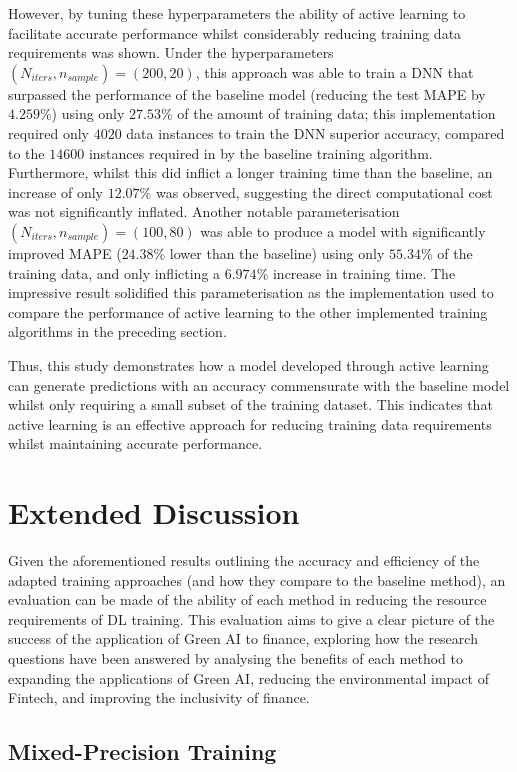 \documentclass[a4paper, 11pt]{report}
\begin{document}
    However, by tuning these hyperparameters the ability of active learning to facilitate accurate performance whilst considerably reducing training data requirements was shown. Under the hyperparameters $(N_{iters}, n_{sample}) = (200, 20)$, this approach was able to train a DNN that surpassed the performance of the baseline model (reducing the test MAPE by $4.259\%$) using only $27.53\%$ of the amount of training data; this implementation required only $4020$ data instances to train the DNN superior accuracy, compared to the $14600$ instances required in by the baseline training algorithm. Furthermore, whilst this did inflict a longer training time than the baseline, an increase of only $12.07\%$ was observed, suggesting the direct computational cost was not significantly inflated. Another notable parameterisation $(N_{iters}, n_{sample}) = (100, 80)$ was able to produce a model with significantly improved MAPE ($24.38\%$ lower than the baseline) using only $55.34\%$ of the training data, and only inflicting a $6.974\%$ increase in training time. The impressive result solidified this parameterisation as the implementation used to compare the performance of active learning to the other implemented training algorithms in the preceding section. 

    Thus, this study demonstrates how a model developed through active learning can generate predictions with an accuracy commensurate with the baseline model whilst only requiring a small subset of the training dataset. This indicates that active learning is an effective approach for reducing training data requirements whilst maintaining accurate performance.


    \section{Extended Discussion}

    Given the aforementioned results outlining the accuracy and efficiency of the adapted training approaches (and how they compare to the baseline method), an evaluation can be made of the ability of each method in reducing the resource requirements of DL training. This evaluation aims to give a clear picture of the success of the application of Green AI to finance, exploring how the research questions have been answered by analysing the benefits of each method to expanding the applications of Green AI, reducing the environmental impact of Fintech, and improving the inclusivity of finance.


    \subsection{Mixed-Precision Training}
\end{document}
